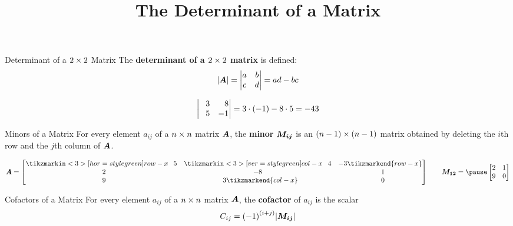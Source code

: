 \documentclass{beamer}
\title[MA245 - Section 3.4]{The Determinant of a Matrix}
\begin{document}
\begin{frame}
  \titlepage
\end{frame}

\begin{frame}
\begin{block}{Determinant of a $2 \times 2$ Matrix}
The \textbf{determinant of a $2 \times 2$ matrix} is defined:
\begin{equation*}
{\left\lvert \boldsymbol{A}\right\rvert} = 
\begin{vmatrix}
a & b \\
c & d
\end{vmatrix}
=ad-bc
\end{equation*}
\end{block}\pause
\begin{example}
\begin{equation*}
\begin{vmatrix}
\+3 & \+8\\
\+5 & -1
\end{vmatrix}
=3\cdot (-1) - 8\cdot 5=-43
\end{equation*}
\end{example}
\end{frame}

\begin{frame}
\begin{block}{Minors of a Matrix}
For every element $a_{ij}$ of a $n \times n$ matrix $\boldsymbol{A}$, the \textbf{minor} $\boldsymbol{M_{ij}}$ is an $(n-1) \times (n-1)$ matrix obtained by deleting the $i$th row and the $j$th column of $\boldsymbol{A}$.
\end{block}\pause
\begin{example}
\begin{equation*}
\mat{A}=
\begin{bmatrix}
	\tikzmarkin<3>[hor=style green]{row-x}\+5 & \tikzmarkin<3>[ver=style green]{col-x}\+4 &  -3\tikzmarkend{row-x}\\
	\+2 &  -8 & \+1\\
	\+9 & \+3\tikzmarkend{col-x} & \+0\\
\end{bmatrix}
\qquad
\mat{M_{12}}=\pause
\begin{bmatrix}
		2 & 1\\
		9 & 0\\
\end{bmatrix}
\end{equation*}
\end{example}\pause
\begin{block}{Cofactors of a Matrix}
For every element $a_{ij}$ of a $n \times n$ matrix $\boldsymbol{A}$, the \textbf{cofactor} of $a_{ij}$ is the scalar
\begin{equation*}
C_{ij}={(-1)}^{(i+j)}{\left\lvert \boldsymbol{M_{ij}}\right\rvert}
\end{equation*}
\end{block}
\end{frame}
\end{document}

